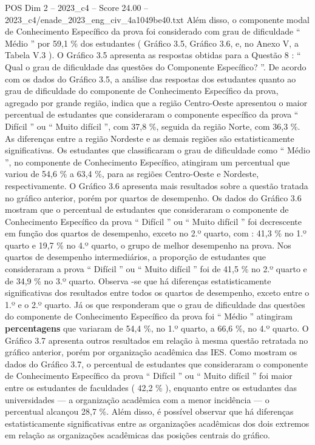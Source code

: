 \begin{textsample}{POS Dim 2 – 2023\_c4 – Score 24.00 – 2023\_c4/enade\_2023\_eng\_civ\_4a1049be40.txt}
Além disso, o componente modal de Conhecimento Específico da prova foi considerado com grau de dificuldade “ Médio ” por 59,1 \% dos estudantes ( Gráfico 3.5, Gráfico 3.6, e, no Anexo V, a Tabela V.3 ).
O Gráfico 3.5 apresenta as respostas obtidas para a Questão 8 : “ Qual o grau de dificuldade das questões do Componente Específico? ”.
De acordo com os dados do Gráfico 3.5, a análise das respostas dos estudantes quanto ao grau de dificuldade do componente de Conhecimento Específico da prova, agregado por grande região, indica que a região Centro-Oeste apresentou o maior percentual de estudantes que consideraram o componente específico da prova “ Difícil ” ou “ Muito difícil ”, com 37,8 \%, seguida da região Norte, com 36,3 \%.
As diferenças entre a região Nordeste e as demais regiões são estatisticamente significativas.
Os estudantes que classificaram o grau de dificuldade como “ Médio ”, no componente de Conhecimento Específico, atingiram um percentual que variou de 54,6 \% a 63,4 \%, para as regiões Centro-Oeste e Nordeste, respectivamente.
O Gráfico 3.6 apresenta mais resultados sobre a questão tratada no gráfico anterior, porém por quartos de desempenho.
Os dados do Gráfico 3.6 mostram que o percentual de estudantes que consideraram o componente de Conhecimento Específico da prova “ Difícil ” ou “ Muito difícil ” foi decrescente em função dos quartos de desempenho, exceto no 2.º quarto, com : 41,3 \% no 1.º quarto e 19,7 \% no 4.º quarto, o grupo de melhor desempenho na prova.
Nos quartos de desempenho intermediários, a proporção de estudantes que consideraram a prova “ Difícil ” ou “ Muito difícil ” foi de 41,5 \% no 2.º quarto e de 34,9 \% no 3.º quarto.
Observa -se que há diferenças estatisticamente significativas dos resultados entre todos os quartos de desempenho, exceto entre o 1.º e o 2.º quarto.
Já os que responderam que o grau de dificuldade das questões do componente de Conhecimento Específico da prova foi “ Médio ” atingiram \textbf{percentagens} que variaram de 54,4 \%, no 1.º quarto, a 66,6 \%, no 4.º quarto.
O Gráfico 3.7 apresenta outros resultados em relação à mesma questão retratada no gráfico anterior, porém por organização acadêmica das IES.
Como mostram os dados do Gráfico 3.7, o percentual de estudantes que consideraram o componente de Conhecimento Específico da prova “ Difícil ” ou “ Muito difícil ” foi maior entre os estudantes de faculdades ( 42,2 \% ), enquanto entre os estudantes das universidades — a organização acadêmica com a menor incidência — o percentual alcançou 28,7 \%.
Além disso, é possível observar que há diferenças estatisticamente significativas entre as organizações acadêmicas dos dois extremos em relação as organizações acadêmicas das posições centrais do gráfico.

\end{textsample}
